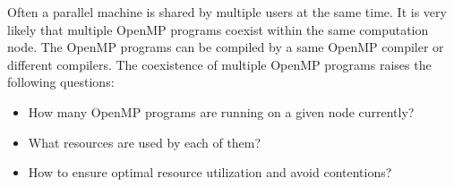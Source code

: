 Often a parallel machine is shared by multiple users at the same time.
It is very likely that multiple OpenMP programs coexist within the same computation node. 
The OpenMP programs can be compiled by a same OpenMP compiler or different compilers. 
The coexistence of multiple OpenMP programs raises the following questions:
\begin{itemize}
\item How many OpenMP programs are running on a given node currently?
\item What resources are used by each of them?
\item How to ensure optimal resource utilization and avoid contentions?
\end{itemize}

